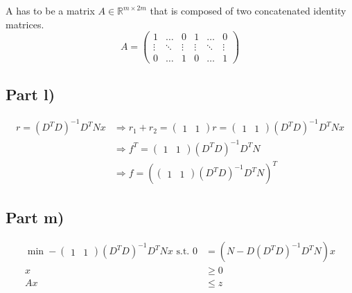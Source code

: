 \documentclass[10pt,a4paper]{article}
\begin{document}
A has to be a matrix $A \in \mathbb{R}^{m \times 2m}$ that is composed of two concatenated identity matrices.
\begin{equation*}
  A = \begin{pmatrix}
    1 & \dots & 0 & 1 & \dots & 0\\
    \vdots & \ddots & \vdots & \vdots & \ddots & \vdots\\
    0 & \dots & 1 & 0 & \dots & 1
  \end{pmatrix}
\end{equation*}

\subsection*{Part l)}

\begin{align*}
  r = (D^{T}D)^{-1}D^{T}Nx & \Rightarrow r_{1} + r_{2} = \begin{pmatrix}1 & 1\end{pmatrix}r = \begin{pmatrix}1 & 1\end{pmatrix}(D^{T}D)^{-1}D^{T}Nx\\
                           & \Rightarrow f^{T} = \begin{pmatrix}1 & 1\end{pmatrix}(D^{T}D)^{-1}D^{T}N\\
                           & \Rightarrow f = \left( \begin{pmatrix}1 & 1\end{pmatrix}(D^{T}D)^{-1}D^{T}N \right)^{T}
\end{align*}

\subsection*{Part m)}

\begin{align*}
  \min -\begin{pmatrix}1 & 1\end{pmatrix}(D^{T}D)^{-1}D^{T}Nx \text{ s.t. } 0 & = (N - D(D^{T}D)^{-1}D^{T}N)x\\
  x & \ge 0\\
  Ax & \le z
\end{align*}
\end{document}
